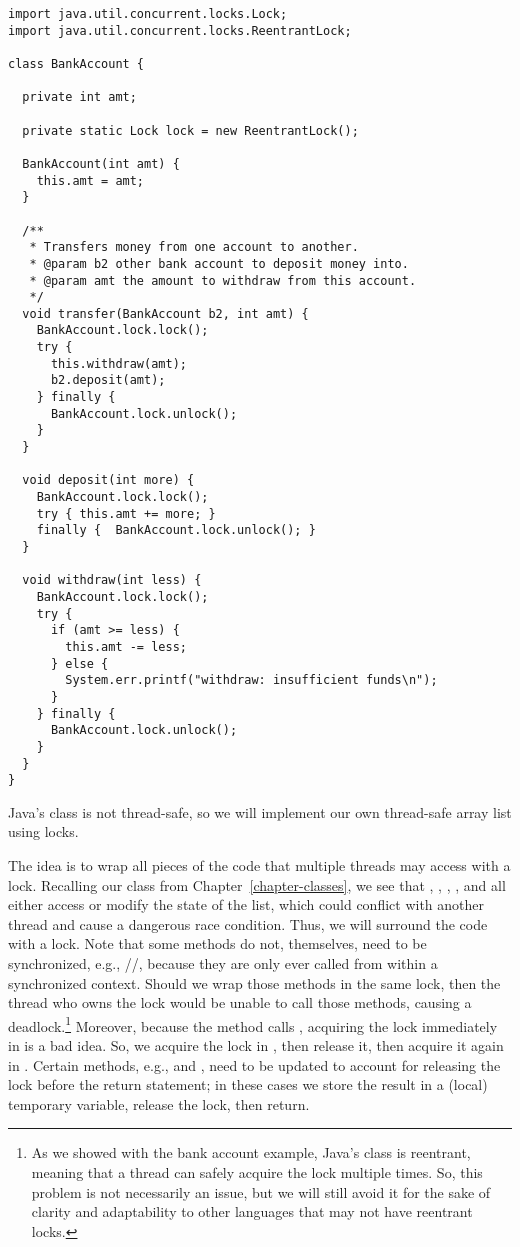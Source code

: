 \begin{lstlisting}[language=MyJava]
import java.util.concurrent.locks.Lock;
import java.util.concurrent.locks.ReentrantLock;

class BankAccount {

  private int amt;

  private static Lock lock = new ReentrantLock();

  BankAccount(int amt) {
    this.amt = amt;
  }

  /**
   * Transfers money from one account to another.
   * @param b2 other bank account to deposit money into.
   * @param amt the amount to withdraw from this account.
   */
  void transfer(BankAccount b2, int amt) {
    BankAccount.lock.lock();
    try {
      this.withdraw(amt);
      b2.deposit(amt);
    } finally {
      BankAccount.lock.unlock();
    }
  }

  void deposit(int more) {
    BankAccount.lock.lock();
    try { this.amt += more; } 
    finally {  BankAccount.lock.unlock(); }
  }

  void withdraw(int less) {
    BankAccount.lock.lock();
    try {
      if (amt >= less) { 
        this.amt -= less; 
      } else { 
        System.err.printf("withdraw: insufficient funds\n"); 
      }
    } finally {
      BankAccount.lock.unlock();
    }
  }
}
\end{lstlisting}

Java's  class is not thread-safe, so we will implement our own thread-safe array list using locks. 

The idea is to wrap all pieces of the code that multiple threads may access with a lock. 
Recalling our  class from Chapter~\ref{chapter-classes}, we see that , , , , and  all either access or modify the state of the list, which could conflict with another thread and cause a dangerous race condition. 
Thus, we will surround the code with a lock. 
Note that some methods do not, themselves, need to be synchronized, e.g., //, because they are only ever called from within a synchronized context. 
Should we wrap those methods in the same lock, then the thread who owns the lock would be unable to call those methods, causing a deadlock.\footnote{As we showed with the bank account example, Java's  class is reentrant, meaning that a thread can safely acquire the lock multiple times. So, this problem is not necessarily an issue, but we will still avoid it for the sake of clarity and adaptability to other languages that may not have reentrant locks.} 
Moreover, because the  method calls , acquiring the lock immediately in  is a bad idea. 
So, we acquire the lock in , then release it, then acquire it again in . 
Certain methods, e.g.,  and , need to be updated to account for releasing the lock before the return statement; in these cases we store the result in a (local) temporary variable, release the lock, then return. 

